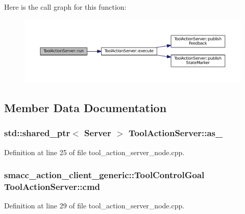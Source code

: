 Here is the call graph for this function\+:
\nopagebreak
\begin{figure}[H]
\begin{center}
\leavevmode
\includegraphics[width=350pt]{classToolActionServer_adbf39061e0f8c74352cbdc695d7d8469_cgraph}
\end{center}
\end{figure}




\subsection{Member Data Documentation}
\subsubsection[{\texorpdfstring{as\+\_\+}{as_}}]{\setlength{\rightskip}{0pt plus 5cm}std\+::shared\+\_\+ptr$<$ {\bf Server} $>$ Tool\+Action\+Server\+::as\+\_\+}\hypertarget{classToolActionServer_abeb62e08e08d40e6a65b199c86da6d69}{}\label{classToolActionServer_abeb62e08e08d40e6a65b199c86da6d69}


Definition at line 25 of file tool\+\_\+action\+\_\+server\+\_\+node.\+cpp.

\subsubsection[{\texorpdfstring{cmd}{cmd}}]{\setlength{\rightskip}{0pt plus 5cm}smacc\+\_\+action\+\_\+client\+\_\+generic\+::\+Tool\+Control\+Goal Tool\+Action\+Server\+::cmd}\hypertarget{classToolActionServer_ad2320c18b9cf85de44f77e9815368902}{}\label{classToolActionServer_ad2320c18b9cf85de44f77e9815368902}


Definition at line 29 of file tool\+\_\+action\+\_\+server\+\_\+node.\+cpp.

